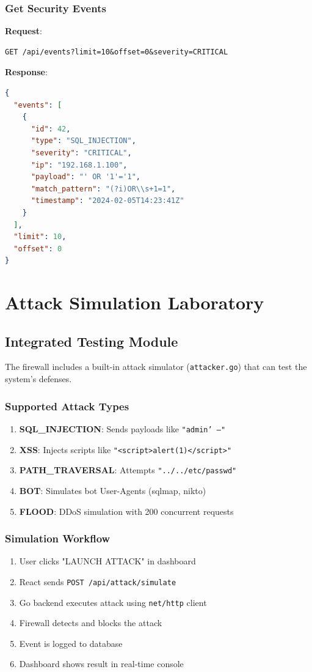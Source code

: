 \documentclass[11pt,a4paper]{report}
\begin{document}
\subsection{Get Security Events}
\textbf{Request}:
\begin{verbatim}
GET /api/events?limit=10&offset=0&severity=CRITICAL
\end{verbatim}

\textbf{Response}:
\begin{lstlisting}[language=json]
{
  "events": [
    {
      "id": 42,
      "type": "SQL_INJECTION",
      "severity": "CRITICAL",
      "ip": "192.168.1.100",
      "payload": "' OR '1'='1",
      "match_pattern": "(?i)OR\\s+1=1",
      "timestamp": "2024-02-05T14:23:41Z"
    }
  ],
  "limit": 10,
  "offset": 0
}
\end{lstlisting}

\chapter{Attack Simulation Laboratory}

\section{Integrated Testing Module}
The firewall includes a built-in attack simulator (\texttt{attacker.go}) that can test the system's defenses.

\subsection{Supported Attack Types}
\begin{enumerate}
    \item \textbf{SQL\_INJECTION}: Sends payloads like \texttt{"admin' --"}
    \item \textbf{XSS}: Injects scripts like \texttt{"<script>alert(1)</script>"}
    \item \textbf{PATH\_TRAVERSAL}: Attempts \texttt{"../../etc/passwd"}
    \item \textbf{BOT}: Simulates bot User-Agents (sqlmap, nikto)
    \item \textbf{FLOOD}: DDoS simulation with 200 concurrent requests
\end{enumerate}

\subsection{Simulation Workflow}
\begin{enumerate}
    \item User clicks "LAUNCH ATTACK" in dashboard
    \item React sends \texttt{POST /api/attack/simulate}
    \item Go backend executes attack using \texttt{net/http} client
    \item Firewall detects and blocks the attack
    \item Event is logged to database
    \item Dashboard shows result in real-time console
\end{enumerate}
\end{document}
